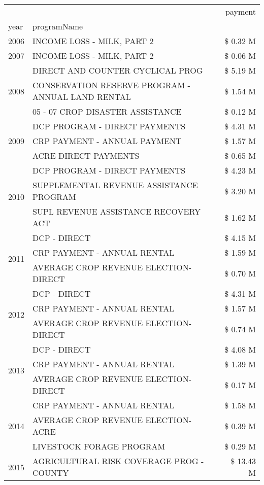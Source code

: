 \begin{tabular}{llr}
\toprule
 &  & payment \\
year & programName &  \\
\midrule
2006 & INCOME LOSS - MILK, PART 2 & \$ 0.32 M \\
\cline{1-3}
2007 & INCOME LOSS - MILK, PART 2 & \$ 0.06 M \\
\cline{1-3}
\multirow[t]{3}{*}{2008} & DIRECT AND COUNTER CYCLICAL PROG & \$ 5.19 M \\
 & CONSERVATION RESERVE PROGRAM - ANNUAL LAND RENTAL & \$ 1.54 M \\
 & 05 - 07 CROP DISASTER ASSISTANCE & \$ 0.12 M \\
\cline{1-3}
\multirow[t]{3}{*}{2009} & DCP PROGRAM - DIRECT PAYMENTS & \$ 4.31 M \\
 & CRP PAYMENT - ANNUAL PAYMENT & \$ 1.57 M \\
 & ACRE DIRECT PAYMENTS & \$ 0.65 M \\
\cline{1-3}
\multirow[t]{3}{*}{2010} & DCP PROGRAM - DIRECT PAYMENTS & \$ 4.23 M \\
 & SUPPLEMENTAL REVENUE ASSISTANCE PROGRAM & \$ 3.20 M \\
 & SUPL REVENUE ASSISTANCE RECOVERY ACT & \$ 1.62 M \\
\cline{1-3}
\multirow[t]{3}{*}{2011} & DCP - DIRECT & \$ 4.15 M \\
 & CRP PAYMENT - ANNUAL RENTAL & \$ 1.59 M \\
 & AVERAGE CROP REVENUE ELECTION-DIRECT & \$ 0.70 M \\
\cline{1-3}
\multirow[t]{3}{*}{2012} & DCP - DIRECT & \$ 4.31 M \\
 & CRP PAYMENT - ANNUAL RENTAL & \$ 1.57 M \\
 & AVERAGE CROP REVENUE ELECTION-DIRECT & \$ 0.74 M \\
\cline{1-3}
\multirow[t]{3}{*}{2013} & DCP - DIRECT & \$ 4.08 M \\
 & CRP PAYMENT - ANNUAL RENTAL & \$ 1.39 M \\
 & AVERAGE CROP REVENUE ELECTION-DIRECT & \$ 0.17 M \\
\cline{1-3}
\multirow[t]{3}{*}{2014} & CRP PAYMENT - ANNUAL RENTAL & \$ 1.58 M \\
 & AVERAGE CROP REVENUE ELECTION-ACRE & \$ 0.39 M \\
 & LIVESTOCK FORAGE PROGRAM & \$ 0.29 M \\
\cline{1-3}
\multirow[t]{3}{*}{2015} & AGRICULTURAL RISK COVERAGE PROG - COUNTY & \$ 13.43 M \\

\end{tabular}

